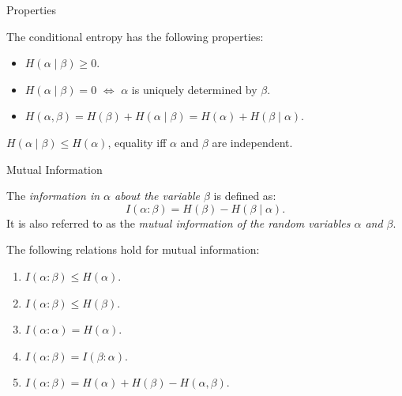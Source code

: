 \documentclass[handout,aspectratio=169]{beamer}
\begin{document}
\begin{frame}{Properties}
\begin{lemma}
    The conditional entropy has the following properties:
    \begin{itemize}
        \item \(H(\alpha\mid\beta) \ge 0\).
        \item \(H(\alpha\mid\beta) = 0\) \(\iff\) \(\alpha\) is uniquely determined by \(\beta\).
        \item \(H(\alpha,\beta) = H(\beta) + H(\alpha\mid\beta) = H(\alpha) + H(\beta\mid\alpha)\).
    \end{itemize}
\end{lemma}
\medskip\pause

\begin{corollary}
    \(H(\alpha \mid \beta) \le H(\alpha)\), equality iff $\alpha$ and $\beta$ are independent.
\end{corollary}

\end{frame}

\begin{frame}{Mutual Information}
\begin{definition}
    The \emph{information in \(\alpha\) about the variable \(\beta\)} is defined as:
    \[
    I(\alpha:\beta) = H(\beta) - H(\beta\mid\alpha).
    \]
    It is also referred to as the \emph{mutual information of the random variables \(\alpha\) and \(\beta\)}.
\end{definition}

\begin{lemma}
    The following relations hold for mutual information:
    \begin{enumerate}
        \item \(I(\alpha:\beta) \le H(\alpha)\).
        \item \(I(\alpha:\beta) \le H(\beta)\).
        \item \(I(\alpha:\alpha) = H(\alpha)\).
        \item \(I(\alpha:\beta) = I(\beta:\alpha)\).
        \item \(I(\alpha:\beta) = H(\alpha) + H(\beta) - H(\alpha,\beta)\).
    \end{enumerate}
\end{lemma}
\end{frame}
\end{document}
